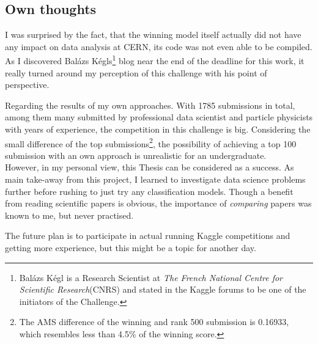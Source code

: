 \subsection{Own thoughts}
I was surprised by the fact, that the winning model itself actually did not have any impact on data analysis at CERN, its code was not even able to be compiled. As I discovered Balázs Kégls\footnote{Balázs Kégl is a Research Scientist at \emph{The French National Centre for Scientific Research}(CNRS) and stated in the Kaggle forums to be one of the initiators of the Challenge.} blog near the end of the deadline for this work, it really turned around my perception of this challenge with his point of perspective.

Regarding the results of my own approaches. With 1785 submissions in total, among them many submitted by professional data scientist and particle physicists with years of experience, the competition in this challenge is big.  Considering the small difference of the top submissions\footnote{The AMS difference of the winning and rank 500 submission  is 0.16933, which resembles less than 4.5\% of the winning score.}, the possibility of achieving a top 100 submission with an own approach is unrealistic for an undergraduate.\\
However, in my personal view, this Thesis can be considered as a success. As main take-away from this project, I learned to investigate data science problems further before rushing to just try any classification models. Though a benefit from reading scientific papers is obvious, the importance of \emph{comparing} papers was known to me, but never practised.

The future plan is to participate in actual running Kaggle competitions and getting more experience, but this might be a topic for another day.
	{\pagebreak \thispagestyle{empty} \cleardoublepage}{\clearpage}